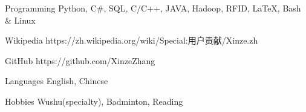 

\vspace{-1.5mm}
\begin{cvskills}


\cvskill
{Programming} %
{Python, C\#, SQL, C/C++, JAVA, Hadoop, RFID, LaTeX, Bash \& Linux} %


\cvskill
{Wikipedia} %
{{https://zh.wikipedia.org/wiki/Special:用户贡献/Xinze.zh}} %


\cvskill
{GitHub} %
{https://github.com/XinzeZhang} %


\cvskill
{Languages} %
{English, Chinese} %

\cvskill
{Hobbies} %
{Wushu(specialty), Badminton, Reading} %

\end{cvskills}